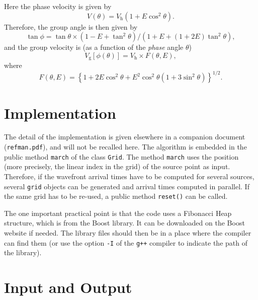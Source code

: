 \documentclass{article}
\begin{document}
Here the phase velocity is given by
\begin{equation}
  V(\theta) = V_\mathrm{h}(1 + E\cos^2\theta).
\end{equation}
Therefore, the group angle is then given by
\begin{equation}
  \tan\phi = \tan\theta\times(1 - E + \tan^2\theta)/(1 + E + (1+2E)\tan^2\theta),
\end{equation}
and the group velocity is (as a function of the \emph{phase} angle $\theta$)
\begin{equation}
  V_\mathrm{g}[\phi(\theta)] = V_\mathrm{h}\times F(\theta,E),
\end{equation}
where 
\begin{equation}
  F(\theta,E) = \left\{ 1 + 2E\cos^2\theta +E^2\cos^2\theta\left( 1 + 3\sin^2\theta\right)\right\}^{1/2}.
\end{equation}

\section{Implementation}

The detail of the implementation is given elsewhere in a companion document (\verb+refman.pdf+), and will not be recalled here. The algorithm is embedded in the public method \verb+march+ of the class \verb+Grid+. The method \verb+march+ uses the position (more precisely, the linear index in the grid) of the source point as input. Therefore, if the wavefront arrival times have to be computed for several sources, several \verb+grid+ objects can be generated and arrival times computed in parallel. If the same grid has to be re-used, a public method \verb+reset()+ can be called.

The one important practical point is that the code uses a Fibonacci Heap structure, which is from the Boost library. It can be downloaded on the Boost website if needed. The library files should then be in a place where the compiler can find them (or use the option \verb+-I+ of the \verb|g++| compiler to indicate the path of the library). 

\section{Input and Output}
\end{document}
